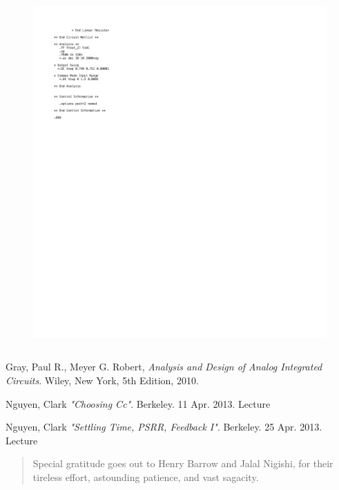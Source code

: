 \documentclass[]{article}
\begin{document}
			\begin{figure}
				\includegraphics[width=1.5\textwidth]{code_pg2.pdf}
			\end{figure}
			$$$$
			\newpage

			\begin{thebibliography}{9}

 			 Gray, Paul R., Meyer G. Robert,
 			 \emph{Analysis and Design of Analog Integrated Circuits}.
  			Wiley, New York,
			5th Edition,
 			2010.

 			 Nguyen, Clark
 			 \emph{"Choosing Cc"}.
			Berkeley. 11 Apr. 2013. Lecture
			
 			 Nguyen, Clark
 			 \emph{"Settling Time, PSRR, Feedback I"}.
			Berkeley. 25 Apr. 2013. Lecture

			\end{thebibliography}
			
			\newpage
			\renewcommand{\abstractname}{Acknowledgements}
				\begin{abstract}$$$$
				Special gratitude goes out to Henry Barrow and Jalal Nigishi, for their tireless effort, astounding patience, and vast sagacity.
				\end{abstract}

		
	
	
\end{document}
